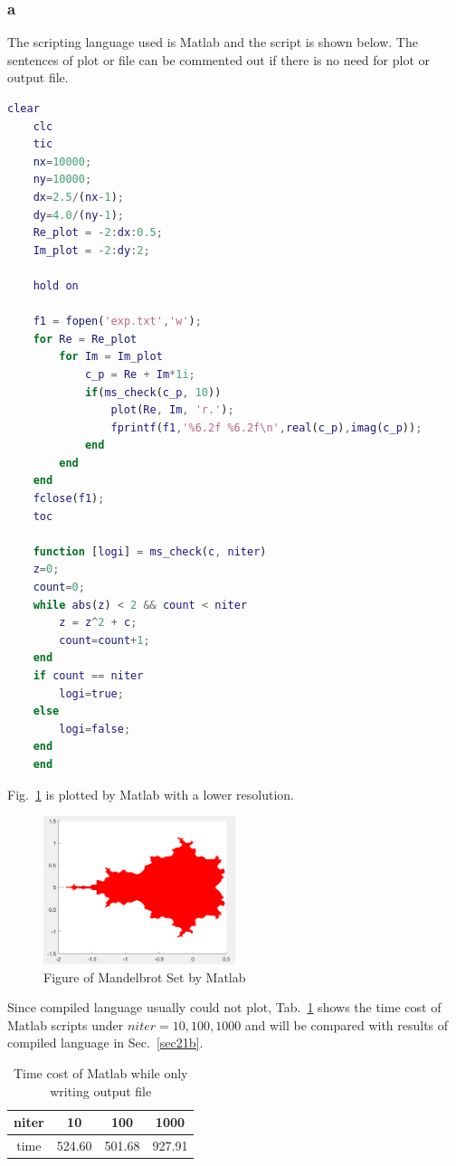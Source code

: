 \documentclass[letterpaper,10pt]{article}
\begin{document}
\subsubsection{a}\label{sec21a}
The scripting language used is Matlab and the script is shown below. The sentences of plot or file 
can be commented out if there is no need for plot or output file. 
{\small\begin{framed}
  \begin{lstlisting}[language=Matlab]
    clear
    clc
    tic
    nx=10000;
    ny=10000;
    dx=2.5/(nx-1);
    dy=4.0/(ny-1);
    Re_plot = -2:dx:0.5;
    Im_plot = -2:dy:2;

    hold on

    f1 = fopen('exp.txt','w');
    for Re = Re_plot
        for Im = Im_plot
            c_p = Re + Im*1i;
            if(ms_check(c_p, 10))
                plot(Re, Im, 'r.');
                fprintf(f1,'%6.2f %6.2f\n',real(c_p),imag(c_p));
            end
        end
    end
    fclose(f1);
    toc

    function [logi] = ms_check(c, niter)
    z=0;
    count=0;
    while abs(z) < 2 && count < niter
        z = z^2 + c;
        count=count+1;
    end
    if count == niter
        logi=true;
    else
        logi=false;
    end
    end
    \end{lstlisting}
\end{framed}}

Fig.~\ref{figMat} is plotted by Matlab with a lower resolution. 
\begin{figure}[h]
  \centering
  \includegraphics[width=0.5\textwidth]{FigMatlab.png}
  \caption{Figure of Mandelbrot Set by Matlab}
  \label{figMat}
\end{figure}

Since compiled language usually could not plot, Tab.~\ref{tabComMat} shows the time cost 
of Matlab scripts under $niter = 10,100,1000$ and will be compared with results of compiled language 
in Sec.~\ref{sec21b}.
\begin{table}
\centering
\caption{Time cost of Matlab while only writing output file}\label{tabComMat}
\begin{tabular}{cccc}
  \hline
  niter & 10 & 100 & 1000 \\
  \hline
  time & 524.60 & 501.68 & 927.91 \\
  \hline
\end{tabular}
\end{table}
\end{document}
